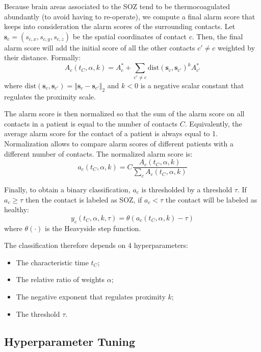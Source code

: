 Because brain areas associated to the SOZ tend to be thermocoagulated
abundantly (to avoid having to re-operate), we compute
a final alarm score that keeps into consideration the alarm scores of the 
surrounding contacts.
Let $\mathbf{s}_c=(s_{c,x}, s_{c,y}, s_{c,z})$ be the spatial coordinates of 
contact $c$.
Then, the final alarm score will add the initial score of all the other contacts
$c'\neq c$ weighted by their distance.
Formally:
\begin{equation}
    A_c(t_C,\alpha,k) = A^*_c + \sum_{c'\neq c}
    \text{dist}(\mathbf{s}_c,\mathbf{s}_{c'})^k A^*_{c'}
\end{equation}
where
$\text{dist}(\mathbf{s}_c, \mathbf{s}_{c'})=
\Vert\mathbf{s}_c-\mathbf{s}_{c'}\Vert_2$
and $k<0$ is a negative scalar constant that regulates the proximity scale.

The alarm score is then normalized so that the sum of the alarm score on all
contacts in a patient is equal to the number of contacts $C$.
Equivalently, the average alarm score for the contact of a patient is always 
equal to 1.
Normalization allows to compare alarm scores of different patients with a
different number of contacts.
The normalized alarm score is:
\begin{equation}
    a_c(t_C,\alpha,k) = C\frac{A_c(t_C,\alpha,k)}{\sum_c A_c(t_C,\alpha,k)}
\end{equation}

Finally, to obtain a binary classification, $a_c$ is thresholded by a threshold
$\tau$.
If $a_c\geq\tau$ then the contact is labeled as SOZ, if $a_c<\tau$ the contact
will be labeled as healthy:
\begin{equation}
    y_c(t_C,\alpha,k,\tau) = \theta(a_c(t_C,\alpha,k)-\tau)
\end{equation}
where $\theta(\cdot)$ is the Heavyside step function.

The classification therefore depends on 4 hyperparameters:
\begin{itemize}
    \item The characteristic time $t_C$;
    \item The relative ratio of weights $\alpha$;
    \item The negative exponent that regulates proximity $k$;
    \item The threshold $\tau$.
\end{itemize}


\subsection{Hyperparameter Tuning}  \label{meth:opt}

